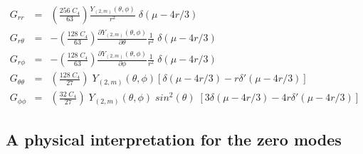 \documentclass[12pt,aps,floats,showpacs,amssymb,tightenlines]{revtex4}
\begin{document}
 \begin{eqnarray}
 G_{rr} &=& \left( \frac{256 \; C_4}{63}\right)   \frac{Y_{(2,m)}(\theta,\phi)}{r^2} \;\delta ( \mu - 4r/3) \\
G_{r \theta} &=& -\left( \frac{128 \; C_4}{63}\right)
\frac{\partial Y_{(2,m)}(\theta,\phi)}{\partial \theta}
\frac{1}{r^2} \;\delta ( \mu - 4r/3) \\
G_{r \phi} &=& -\left( \frac{128 \; C_4}{63}\right) \frac{\partial
Y_{(2,m)}(\theta,\phi)}{\partial \phi}
\frac{1}{r^2} \;\delta ( \mu - 4r/3) \\
G_{\theta \theta} &=& \left( \frac{128 \; C_4}{27}\right)\;
Y_{(2,m)}(\theta,\phi) \left[ \delta ( \mu - 4r/3) - r \delta' ( \mu
- 4r/3) \right] \\
G_{\phi \phi} &=& \left( \frac{32 \; C_4}{27}\right)\;
Y_{(2,m)}(\theta,\phi) \; sin^2(\theta) \;\left[ 3 \delta ( \mu -
4r/3) - 4 r \delta' ( \mu - 4r/3) \right]
\end{eqnarray}

\subsection{A physical interpretation for the zero modes}
\end{document}
